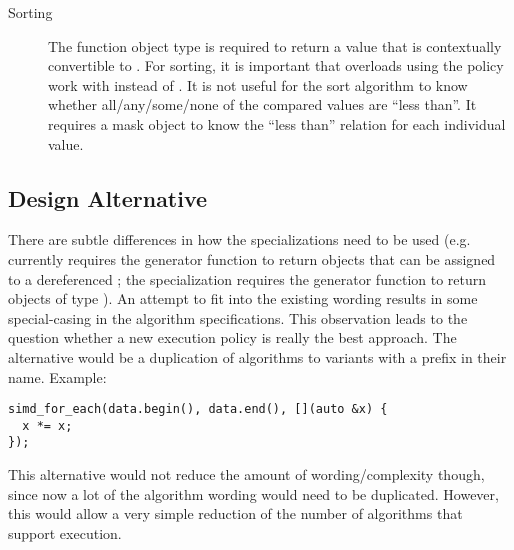 \begin{description}
  \item[Sorting]
    The  function object type is required to return a value that is contextually convertible to \bool.
    For sorting, it is important that overloads using the \simdEP policy work with  instead of \bool.
    It is not useful for the sort algorithm to know whether all/any/some/none of the compared values are “less than”.
    It requires a mask object to know the “less than” relation for each individual value.
\end{description}

\subsection{Design Alternative}
There are subtle differences in how the \simdEP specializations need to be used
(e.g.  currently requires the generator function to return objects that can be assigned to a dereferenced ;
the \simdEP specialization requires the generator function to return objects of type ).
An attempt to fit \simdEPT into the existing wording results in some special-casing in the algorithm specifications.
This observation leads to the question whether a new execution policy is really the best approach.
The alternative would be a duplication of algorithms to variants with a  prefix in their name.
Example:
\smallskip\begin{lstlisting}[style=Vc]
simd_for_each(data.begin(), data.end(), [](auto &x) {
  x *= x;
});
\end{lstlisting}

This alternative would not reduce the amount of wording/complexity though, since now a lot of the algorithm wording would need to be duplicated.
However, this would allow a very simple reduction of the number of algorithms that support \simd execution.

